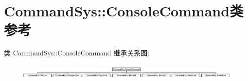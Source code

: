 \hypertarget{class_command_sys_1_1_console_command}{\section{Command\-Sys\-:\-:Console\-Command类 参考}
\label{class_command_sys_1_1_console_command}
}
类 Command\-Sys\-:\-:Console\-Command 继承关系图\-:\begin{figure}[H]
\begin{center}
\leavevmode
\includegraphics[height=0.788177cm]{class_command_sys_1_1_console_command}
\end{center}
\end{figure}
